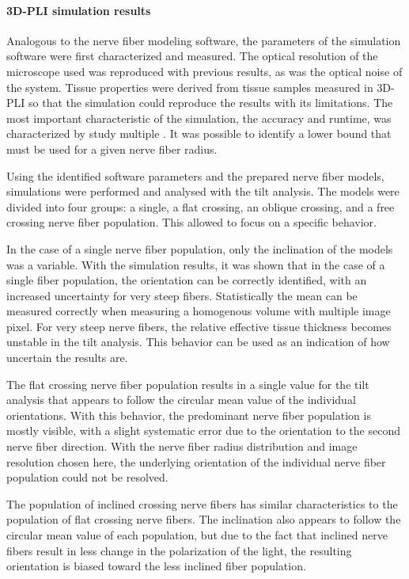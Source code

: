 \paragraph{\acs{3D-PLI} simulation results}
% 
Analogous to the nerve fiber modeling software, the parameters of the simulation software were first characterized and measured.
The optical resolution of the microscope used was reproduced with previous results, as was the optical noise of the system.
Tissue properties were derived from tissue samples measured in \ac{3D-PLI} so that the simulation could reproduce the results with its limitations.
The most important characteristic of the simulation, the accuracy and runtime, was characterized by study multiple \Voxelsize{}.
It was possible to identify a lower bound that must be used for a given nerve fiber radius.
\par
% 
Using the identified software parameters and the prepared nerve fiber models, simulations were performed and analysed with the tilt analysis.
The models were divided into four groups: a single, a flat crossing, an oblique crossing, and a free crossing nerve fiber population.
This allowed to focus on a specific behavior.
\par
% 
In the case of a single nerve fiber population, only the inclination of the models was a variable.
With the simulation results, it was shown that in the case of a single fiber population, the orientation can be correctly identified, with an increased uncertainty for very steep fibers.
Statistically the mean can be measured correctly when measuring a homogenous volume with multiple image pixel.
For very steep nerve fibers, the relative effective tissue thickness becomes unstable in the tilt analysis.
This behavior can be used as an indication of how uncertain the results are.
\par
% 
The flat crossing nerve fiber population results in a single value for the tilt analysis that appears to follow the circular mean value of the individual orientations.
With this behavior, the predominant nerve fiber population is mostly visible, with a slight systematic error due to the orientation to the second nerve fiber direction.
With the nerve fiber radius distribution and image resolution chosen here, the underlying orientation of the individual nerve fiber population could not be resolved.
\par
% 
The population of inclined crossing nerve fibers has similar characteristics to the population of flat crossing nerve fibers.
The inclination also appears to follow the circular mean value of each population, but due to the fact that inclined nerve fibers result in less change in the polarization of the light, the resulting orientation is biased toward the less inclined fiber population.
